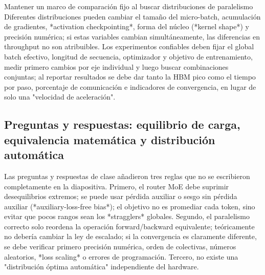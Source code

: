 \documentclass[a4paper]{article}
\begin{document}
\begin{warningbox}{Mantener un marco de comparación fijo al buscar distribuciones de paralelismo}
Diferentes distribuciones pueden cambiar el tamaño del micro-batch, acumulación de gradientes, *activation checkpointing*, forma del núcleo (*kernel shape*) y precisión numérica; si estas variables cambian simultáneamente, las diferencias en throughput no son atribuibles. Los experimentos confiables deben fijar el global batch efectivo, longitud de secuencia, optimizador y objetivo de entrenamiento, medir primero cambios por eje individual y luego buscar combinaciones conjuntas; al reportar resultados se debe dar tanto la HBM pico como el tiempo por paso, porcentaje de comunicación e indicadores de convergencia, en lugar de solo una "velocidad de aceleración".
\end{warningbox}

\subsection{Preguntas y respuestas: equilibrio de carga, equivalencia matemática y distribución automática}

Las preguntas y respuestas de clase añadieron tres reglas que no se escribieron completamente en la diapositiva. Primero, el router MoE debe suprimir desequilibrios extremos; se puede usar pérdida auxiliar o sesgo sin pérdida auxiliar (*auxiliary-loss-free bias*); el objetivo no es promediar cada token, sino evitar que pocos rangos sean los *stragglers* globales. Segundo, el paralelismo correcto solo reordena la operación forward/backward equivalente; teóricamente no debería cambiar la ley de escalado; si la convergencia es claramente diferente, se debe verificar primero precisión numérica, orden de colectivas, números aleatorios, *loss scaling* o errores de programación. Tercero, no existe una "distribución óptima automática" independiente del hardware.


\end{document}

